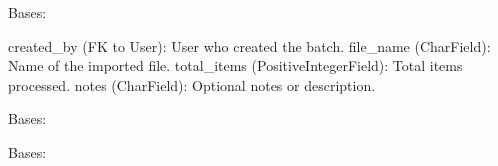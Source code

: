 \documentclass[a4paper,11pt,spanish]{sphinxmanual}
\begin{document}

\begin{fulllineitems}
\label{\detokenize{api/inventory/inventory.models:inventory.models.InventoryInitialBatch}}
\pysigstartsignatures
\pysiglinewithargsret
{}
{\sphinxparamcomma {}}
{}
\pysigstopsignatures
\sphinxAtStartPar
Bases: 
\begin{description}
\sphinxAtStartPar
created\_by (FK to User): User who created the batch.
file\_name (CharField): Name of the imported file.
total\_items (PositiveIntegerField): Total items processed.
notes (CharField): Optional notes or description.

\end{description}

\begin{fulllineitems}
\label{\detokenize{api/inventory/inventory.models:inventory.models.InventoryInitialBatch.DoesNotExist}}
\pysigstartsignatures
\pysigline
{}
\pysigstopsignatures
\sphinxAtStartPar
Bases: 

\end{fulllineitems}


\begin{fulllineitems}
\label{\detokenize{api/inventory/inventory.models:inventory.models.InventoryInitialBatch.MultipleObjectsReturned}}
\pysigstartsignatures
\pysigline
{}
\pysigstopsignatures
\sphinxAtStartPar
Bases: 

\end{fulllineitems}


\end{fulllineitems}
\end{document}
